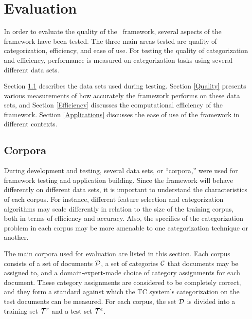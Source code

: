 \chapter{Evaluation}
\label{Evaluation}

In order to evaluate the quality of the \aicat\ framework, several
aspects of the framework have been tested.  The three main areas
tested are quality of categorization, efficiency, and ease of use.
For testing the quality of categorization and efficiency, performance
is measured on categorization tasks using several different data sets.

Section \ref{Corpora} describes the data sets used during testing.
Section \ref{Quality} presents various measurements of how accurately
the framework performs on these data sets, and Section
\ref{Efficiency} discusses the computational efficiency of the
framework.  Section \ref{Applications} discusses the ease of use of
the framework in different contexts.

\section{Corpora}
\label{Corpora}

During development and testing, several data sets, or ``corpora,''
were used for framework testing and application building.  Since the
framework will behave differently on different data sets, it is
important to understand the characteristics of each corpus.  For
instance, different feature selection and categorization algorithms
may scale differently in relation to the size of the training corpus,
both in terms of efficiency and accuracy. \cite{chakrabarti:98} Also,
the specifics of the categorization problem in each corpus may be more
amenable to one categorization technique or another.

The main corpora used for evaluation are listed in this section.  Each
corpus consists of a set of documents $\mathcal{D}$, a set of categories $\mathcal{C}$ that
documents may be assigned to, and a domain-expert-made choice of
category assignments for each document.  These category assignments
are considered to be completely correct, and they form a standard
against which the TC system's categorization on the test documents can
be measured.  For each corpus, the set $\mathcal{D}$ is divided into a
training set $\mathcal{T}^r$ and a test set $\mathcal{T}^e$.

